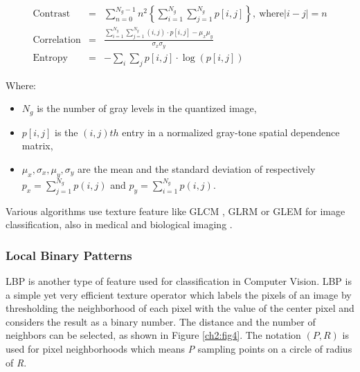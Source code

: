 \begin{eqnarray}
\textrm{Contrast} & = & \sum_{n=0}^{N_g-1} n^{2} \left\{ \sum_{i=1}^{N_g} \sum_{j=1}^{N_g} p[i,j] \right\}, \ \textrm{where} |i-j| = n \\
\textrm{Correlation} & = & \frac{ \sum_{i=1}^{N_g} \sum_{j=1}^{N_g} (i,j) \cdot p[i,j] - \mu_x \mu_y }{\sigma_x \sigma_y} \\
\textrm{Entropy} & = & - \sum_{i} \sum_{j} p[i,j] \cdot \log(p[i,j])
\end{eqnarray}

Where:
\begin{itemize}
 \item $N_g$ is the number of gray levels in the quantized image,
 \item $p[i,j]$ is the $(i,j)th$ entry in a normalized gray-tone spatial dependence matrix,
 \item $\mu_x,\sigma_x,\mu_y,\sigma_y$ are the mean and the standard deviation of respectively $p_x = \sum_{j=1}^{N_g}p(i,j)$ and  $p_y = \sum_{i=1}^{N_g}p(i,j)$.
\end{itemize}

Various algorithms use texture feature like \Gls{GLCM} \cite{texture03}, \Gls{GLRM} \cite{texture02} or \Gls{GLEM} for image classification,
also in medical \cite{texture04} and biological imaging \cite{textGLCMbiol}.


\subsubsection{Local Binary Patterns}
\label{ch2:lbp}
\Gls{LBP} is another type of feature used for classification in Computer Vision. \Gls{LBP} is a simple yet very efficient texture operator
which labels the pixels of an image by thresholding the neighborhood of each pixel with the value of the center pixel and considers the result as a binary number.
The distance and the number of neighbors can be selected, as shown in Figure \ref{ch2:fig4}\cite{LBP01}.
The notation $(P,R)$ is used for pixel neighborhoods which means \textit{P} sampling points on a circle of radius of \textit{R}.

